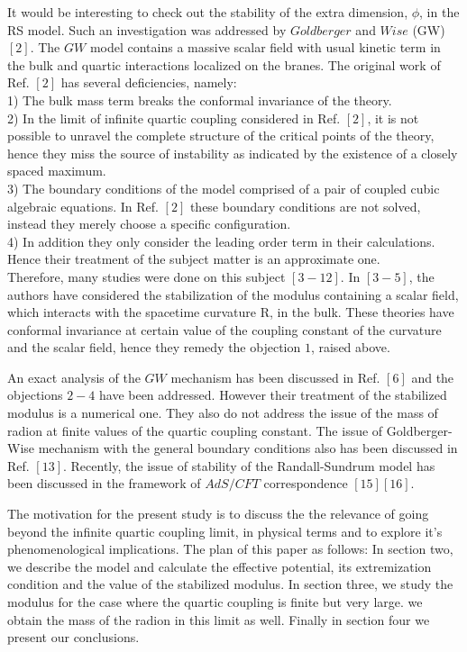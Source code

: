 \documentclass[12pt]{article}
\begin{document}
It would be interesting to check out the stability of the extra dimension, $\phi$, in the RS model. Such an investigation was addressed by $Goldberger$ and $Wise$ (GW) $[2]$. The $GW$ model contains a massive scalar field with usual kinetic term in the bulk and quartic interactions localized on the branes. The original work of Ref. $[2]$ has several deficiencies, namely:\\
1) The bulk mass term breaks the conformal invariance of the
theory.\\
2) In the limit of infinite quartic coupling considered in Ref.
$[2]$, it is not possible to unravel the complete structure of the
critical points of the theory, hence they miss the source of
instability as indicated
by the existence of a closely spaced maximum.\\
3) The boundary conditions of the model comprised of a pair of
coupled cubic algebraic equations. In Ref. $[2]$ these boundary
conditions are not solved, instead
they merely choose a specific configuration.\\
4) In addition they only consider the
 leading order term in their calculations.
Hence their treatment of the subject matter is an approximate one.\\
Therefore, many studies were done on this subject $[3-12]$.
In $[3-5]$, the authors have considered the stabilization
of the modulus containing a scalar field, which interacts with the
spacetime curvature R, in the bulk. These theories have conformal invariance at
certain value of the coupling constant of the curvature and the
scalar field,
hence they remedy the objection $1$, raised above.


 An exact analysis of the $GW$ mechanism has been discussed in Ref.
$[6]$ and the objections $2-4$ have been addressed. However their
treatment of the stabilized modulus is a numerical one. They also do
not address the issue of the mass of radion at finite values of the
quartic coupling constant. The issue of Goldberger-Wise mechanism with the general boundary
conditions also has been discussed in Ref. $[13]$. Recently, the issue of stability of the Randall-Sundrum model has been discussed in the framework of $AdS/CFT$ correspondence $[15][16]$.


 The motivation for the present study is to discuss the the relevance of going
beyond the infinite quartic coupling limit, in physical terms
and to explore it's phenomenological implications. The plan of this paper as follows:
 In section two, we describe the model and calculate the effective potential, its extremization condition and the value of the stabilized modulus. In section three,
we study the modulus for the case where the quartic coupling is
finite but very large. we obtain the mass of the radion in this
limit as well. Finally in section four we present our conclusions.
\end{document}

